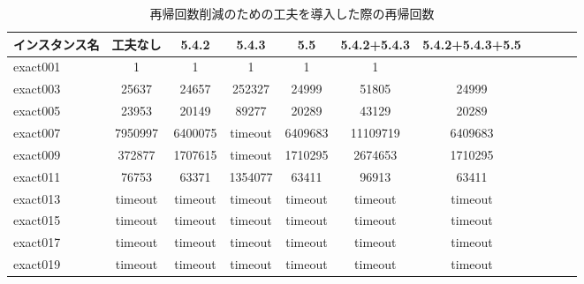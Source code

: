 \documentclass[10.5,a4paper,titlepage, dvipdfmx]{bxjsarticle}
\begin{document}
\begin{table}[H]
    \caption{再帰回数削減のための工夫を導入した際の再帰回数}
    \label{table:data_type}
    \centering
    \begin{tabular}{l|cccccccccr}
        \hline
        インスタンス名  & 工夫なし & 5.4.2  & 5.4.3 & 5.5 & 5.4.2+5.4.3  & 5.4.2+5.4.3+5.5\\
        \hline
        exact001 & 1 & 1 & 1 & 1 & 1\\
        exact003 & 25637 & 24657 & 252327 & 24999 & 51805 & 24999\\
        exact005 & 23953 & 20149 & 89277 & 20289 & 43129 & 20289\\
        exact007 & 7950997 & 6400075 & timeout & 6409683 & 11109719 & 6409683\\
        exact009 & 372877 & 1707615 & timeout & 1710295 & 2674653 & 1710295\\
        exact011 & 76753 & 63371 & 1354077 & 63411 & 96913 & 63411\\
        exact013 & timeout & timeout & timeout & timeout & timeout & timeout\\
        exact015 & timeout & timeout & timeout & timeout & timeout & timeout\\
        exact017 & timeout & timeout & timeout & timeout & timeout & timeout\\
        exact019 & timeout & timeout & timeout & timeout & timeout & timeout\\
        \hline
    \end{tabular}
\end{table}
\end{document}

